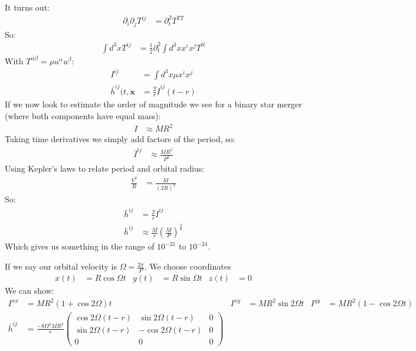 It turns out:
\begin{align*}
	\partial_i\partial_j T^{ij} &= \partial_t^2 T^{TT} 
\end{align*}
So:
\begin{align*}
	\int d^3 x T^{ij} &= \frac{1}{2} \partial_t^2\int d^3 x x^i x^j  T^{tt}
\end{align*}
With $T^{\alpha\beta} = \mu u^\alpha u^\beta$:
\begin{align*}
	I^{ij} &= \int d^3 x \mu x^i x^j \\
	\bar{h}^{ij}(t,\bm{x} &= \frac{2}{r} \ddot{I}^{ij}(t-r)
\end{align*}
If we now look to estimate the order of magnitude we see for a binary star merger (where both components have equal mass):
\begin{align*}
	I &\approx MR^2
\end{align*}
Taking time derivatives we simply add factors of the period, so:
\begin{align*}
	\ddot{I}^{ij} &\approx \frac{MR^2}{P^2}
\end{align*}
Using Kepler's laws to relate period and orbital radius:
\begin{align*}
	\frac{V^2}{R} &= \frac{M}{(2R)^2}
\end{align*}
So:
\begin{align*}
	\bar{h}^{ij} &= \frac{2}{r}\ddot{I}^{ij} \\
	\bar{h}^{ij} &\approx \frac{M}{r} \left(\frac{M}{P}\right)^\frac{2}{3}
\end{align*}
Which gives us something in the range of $10^{-21}$ to $10^{-24}$.

If we say our orbital velocity is $\Omega = \frac{2\pi}{P}$. We choose coordinates 
\begin{align*}
	x(t) &= R\cos\Omega t& y(t) &= R\sin\Omega t & z(t) &= 0
\end{align*}
We can show:
\begin{align*}
	I^{xx} &= MR^2 (1 + \cos 2\Omega) t & I^{xy} &= MR^2\sin2\Omega t & I^{yy} &= MR^2(1-\cos2\Omega t) \\
	\bar{h}^{ij} &= \frac{-8\Omega^2 MR^2}{r} \begin{pmatrix}
		\cos2\Omega(t-r) & \sin2\Omega(t-r) & 0 \\
		\sin2\Omega(t-r) & -\cos2\Omega(t-r) & 0 \\
		0 & 0 & 0
						  \end{pmatrix}
\end{align*}
